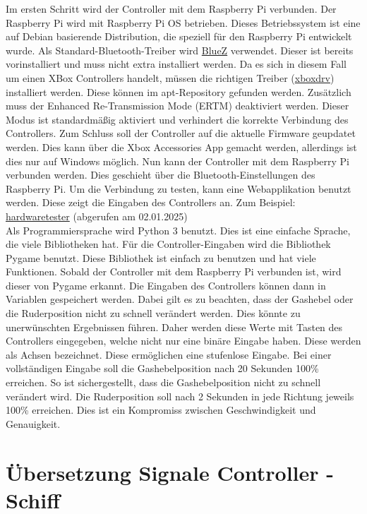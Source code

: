 Im ersten Schritt wird der Controller mit dem Raspberry Pi verbunden. Der Raspberry Pi wird mit Raspberry Pi OS betrieben. 
Dieses Betriebssystem ist eine auf Debian basierende Distribution, die speziell für den Raspberry Pi entwickelt wurde.
Als Standard-Bluetooth-Treiber wird \href{https://www.bluez.org/}{BlueZ} verwendet. Dieser ist bereits vorinstalliert und muss 
nicht extra installiert werden. Da es sich in diesem Fall um einen XBox Controllers handelt, müssen die richtigen Treiber
(\href{https://github.com/xboxdrv/xboxdrv}{xboxdrv}) installiert werden. Diese können im apt-Repository gefunden werden.
Zusätzlich muss der Enhanced Re-Transmission Mode (ERTM) deaktiviert werden. Dieser Modus ist standardmäßig aktiviert und
verhindert die korrekte Verbindung des Controllers. Zum Schluss soll der Controller auf die aktuelle Firmware geupdatet werden.
Dies kann über die Xbox Accessories App gemacht werden, allerdings ist dies nur auf Windows möglich. Nun kann 
der Controller mit dem Raspberry Pi verbunden werden. Dies geschieht über die Bluetooth-Einstellungen des Raspberry Pi.
Um die Verbindung zu testen, kann eine Webapplikation benutzt werden. Diese zeigt die Eingaben des Controllers an. Zum 
Beispiel: \href{https://hardwaretester.com/gamepad}{hardwaretester} (abgerufen am 02.01.2025) 
\\
Als Programmiersprache wird Python 3 benutzt. Dies ist eine einfache Sprache, die viele Bibliotheken hat. Für die
Controller-Eingaben wird die Bibliothek Pygame benutzt. Diese Bibliothek ist einfach zu benutzen und hat viele Funktionen.
Sobald der Controller mit dem Raspberry Pi verbunden ist, wird dieser von Pygame erkannt. Die Eingaben des Controllers
können dann in Variablen gespeichert werden. Dabei gilt es zu beachten, dass der Gashebel oder die Ruderposition nicht
zu schnell verändert werden. Dies könnte zu unerwünschten Ergebnissen führen. Daher werden diese Werte mit Tasten des
Controllers eingegeben, welche nicht nur eine binäre Eingabe haben. Diese werden als Achsen bezeichnet. Diese ermöglichen
eine stufenlose Eingabe. Bei einer vollständigen Eingabe soll die Gashebelposition nach 20 Sekunden 100\% erreichen.
So ist sichergestellt, dass die Gashebelposition nicht zu schnell verändert wird. Die Ruderposition soll nach 2 Sekunden
in jede Richtung jeweils 100\% erreichen. Dies ist ein Kompromiss zwischen Geschwindigkeit und Genauigkeit.

\section{Übersetzung Signale Controller - Schiff}

